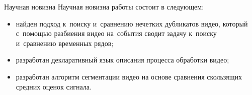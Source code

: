 \documentclass{.local/lib/classes/ndvr-super-article-standalone}
\begin{document}
    \begin{description-item}{Научная новизна}
        Научная новизна работы состоит в следующем:
        \begin{itemize}
            \item найден подход к~поиску и~сравнению нечетких 
            дубликатов видео, который с~помощью разбиения видео 
            на~события сводит задачу к~поиску и~сравнению 
            временных рядов; 
            \item разработан декларативный язык 
            описания процесса обработки видео;
            \item разработан алгоритм сегментации видео 
            на основе сравнения скользящих средних оценок сигнала.
        \end{itemize}
    \end{description-item}
\end{document}
